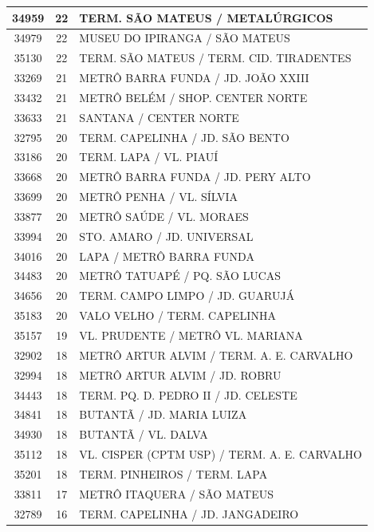 \documentclass[
	12pt,				%
	oneside,			%
	a4paper,			%
	english,			%
	brazil				%
	]{abntex2ppgsi}
\begin{document}
\begin{apendicesenv}
\begin{longtable}{c|c|p{7cm}}
\hline
    34959 & 22    & TERM. SÃO MATEUS / METALÚRGICOS \\
\hline
    34979 & 22    & MUSEU DO IPIRANGA / SÃO MATEUS \\
\hline
    35130 & 22    & TERM. SÃO MATEUS / TERM. CID. TIRADENTES \\
\hline
    33269 & 21    & METRÔ BARRA FUNDA / JD. JOÃO XXIII \\
\hline
    33432 & 21    & METRÔ BELÉM / SHOP. CENTER NORTE \\
\hline
    33633 & 21    & SANTANA / CENTER NORTE \\
\hline
    32795 & 20    & TERM. CAPELINHA / JD. SÃO BENTO \\
\hline
    33186 & 20    & TERM. LAPA / VL. PIAUÍ \\
\hline
    33668 & 20    & METRÔ BARRA FUNDA / JD. PERY ALTO \\
\hline
    33699 & 20    & METRÔ PENHA / VL. SÍLVIA \\
\hline
    33877 & 20    & METRÔ SAÚDE / VL. MORAES \\
\hline
    33994 & 20    & STO. AMARO / JD. UNIVERSAL \\
\hline
    34016 & 20    & LAPA / METRÔ BARRA FUNDA \\
\hline
    34483 & 20    & METRÔ TATUAPÉ / PQ. SÃO LUCAS \\
\hline
    34656 & 20    & TERM. CAMPO LIMPO / JD. GUARUJÁ \\
\hline
    35183 & 20    & VALO VELHO / TERM. CAPELINHA \\
\hline
    35157 & 19    & VL. PRUDENTE / METRÔ VL. MARIANA \\
\hline
    32902 & 18    & METRÔ ARTUR ALVIM / TERM. A. E. CARVALHO \\
\hline
    32994 & 18    & METRÔ ARTUR ALVIM / JD. ROBRU \\
\hline
    34443 & 18    & TERM. PQ. D. PEDRO II / JD. CELESTE \\
\hline
    34841 & 18    & BUTANTÃ / JD. MARIA LUIZA \\
\hline
    34930 & 18    & BUTANTÃ / VL. DALVA \\
\hline
    35112 & 18    & VL. CISPER (CPTM USP) / TERM. A. E. CARVALHO \\
\hline
    35201 & 18    & TERM. PINHEIROS / TERM. LAPA \\
\hline
    33811 & 17    & METRÔ ITAQUERA / SÃO MATEUS \\
\hline
    32789 & 16    & TERM. CAPELINHA / JD. JANGADEIRO \\

\end{longtable}
\end{apendicesenv}
\end{document}
